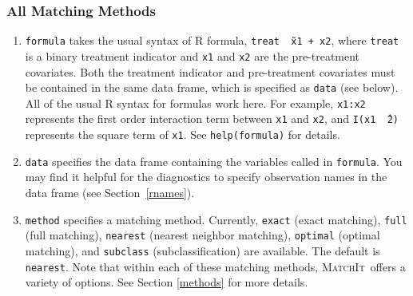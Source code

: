 \documentclass[oneside,letterpaper,titlepage]{article}
\newcommand{\MatchIt}{\textsc{MatchIt}}
\begin{document}
\subsubsection{All Matching Methods}

\begin{enumerate}
  
\item \texttt{formula} takes the usual syntax of R formula, {\tt treat
    \~\ x1 + x2}, where {\tt treat} is a binary treatment indicator
  and {\tt x1} and {\tt x2} are the pre-treatment covariates. Both the
  treatment indicator and pre-treatment covariates must be contained
  in the same data frame, which is specified as {\tt data} (see
  below).  All of the usual R syntax for formulas work here. For
  example, {\tt x1:x2} represents the first order interaction term
  between {\tt x1} and {\tt x2}, and {\tt I(x1 \^\ 2)} represents the
  square term of {\tt x1}. See {\tt help(formula)} for details.
  
\item \texttt{data} specifies the data frame containing the variables
  called in {\tt formula}.  You may find it helpful for the
  diagnostics to specify observation names in the data frame (see
  Section~\ref{rnames}).
  
\item \texttt{method} specifies a matching method. Currently,
  \texttt{exact} (exact matching), \texttt{full} (full matching),
  \texttt{nearest} (nearest neighbor matching), \texttt{optimal}
  (optimal matching), and \texttt{subclass} (subclassification) are
  available. The default is \texttt{nearest}. Note that within each of
  these matching methods, \MatchIt\ offers a variety of options.  See
  Section \ref{methods} for more details.
  

\end{enumerate}
\end{document}
